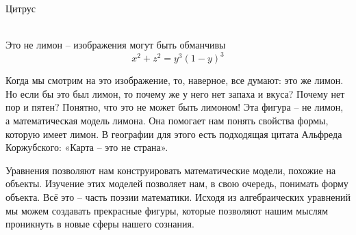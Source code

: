 \documentclass[ru]{./../../common/SurferDesc}%
\begin{document}
\footnotesize

\begin{surferPage}
  \begin{surferTitle}Цитрус\end{surferTitle}  \\ %
Это не лимон – изображения могут быть обманчивы\\
\smallskip
\[x^2 + z^2 = y^3 (1 - y)^3\] 


\singlespacing
Когда мы смотрим на это изображение, то, наверное, все думают: это же лимон. Но если бы это был лимон, то почему же у него нет запаха и вкуса? Почему нет пор и пятен? Понятно, что это не может быть лимоном!
\singlespacing
Эта фигура – не лимон, а математическая модель лимона. Она помогает нам понять свойства формы, которую имеет лимон. В географии для этого есть подходящая цитата Альфреда Коржубского: «Карта – это не страна».\\
\singlespacing

Уравнения позволяют нам конструировать математические модели, похожие на объекты. Изучение этих моделей позволяет нам, в свою очередь, понимать форму объекта.
\singlespacing
Всё это – часть поэзии математики. Исходя из алгебраических уравнений мы можем создавать прекрасные фигуры, которые позволяют нашим мыслям проникнуть в новые сферы нашего сознания.


  \begin{surferText}
     \end{surferText}
\end{surferPage}
\end{document}
